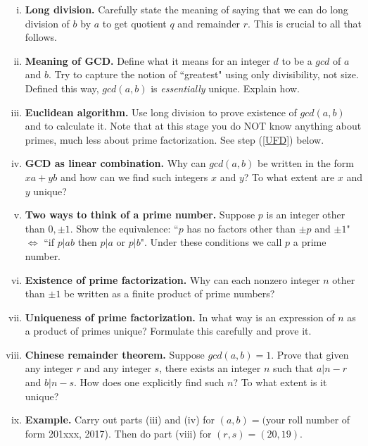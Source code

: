\documentclass{article}
\begin{document}
\begin{enumerate}[(i)]

    \item {\bf Long division.} Carefully state the meaning of saying that we can do long division of $b$ by $a$ to get quotient $q$ and remainder $r$. This is crucial to all that follows.

    \item {\bf Meaning of GCD.} Define what it means for an integer $d$ to be a $gcd$ of $a$ and $b$. Try to capture the notion of ``greatest" using only divisibility, not size. Defined this way, $gcd(a,b)$ is {\it essentially} unique. Explain how.
    
    \item {\bf Euclidean algorithm.} Use long division to prove existence of $gcd(a,b)$ and to calculate it. Note that at this stage you do NOT know anything about primes, much less about prime factorization. See step (\ref{UFD}) below.
    
    \item {\bf GCD as linear combination.} Why can $gcd(a,b)$ be written in the form $xa + yb$ and how can we find such integers $x$ and $y$? To what extent are $x$ and $y$ unique?
    
    \item {\bf Two ways to think of a prime number.} Suppose $p$ is an integer other than $0,\pm 1$. Show the equivalence: ``$p$ has no factors other than $\pm p$ and $\pm 1$" $\Leftrightarrow$  ``if $p|ab$ then $p|a$ or $p|b$". Under these conditions we call $p$ a prime number.
    
    \item {\bf Existence of prime factorization.} Why can each nonzero integer $n$ other than $\pm 1$ be written as a finite product of prime numbers?
    
    \item \label{UFD} {\bf Uniqueness of prime factorization.} In what way is an expression of $n$ as a product of primes unique? Formulate this carefully and prove it.
    
    \item {\bf Chinese remainder theorem.} Suppose $gcd(a,b)=1$. Prove that given any integer $r$ and any integer $s$, there exists an integer $n$ such that $a|n-r$ and $b|n-s$. How does one explicitly find such $n$? To what extent is it unique?
    
    \item {\bf Example.} Carry out parts (iii) and (iv) for $(a,b) = ($your roll number of form 201xxx, 2017). Then do part (viii) for $(r,s) = (20,19)$.

\end{enumerate}
\end{document}
